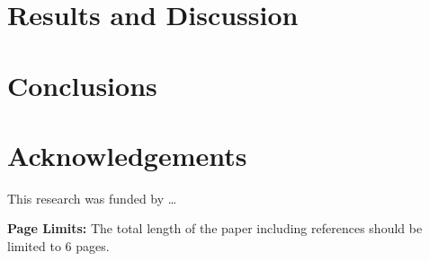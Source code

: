 \documentclass[12pt]{ussci}
\begin{document}
\section{Results and Discussion}
%
\blindtext

\section{Conclusions}
%
\blindtext

\blindtext

\section{Acknowledgements}
This research was funded by \ldots

\noindent\textbf{Page Limits:} The total length of the paper including references should be limited to 6 pages.

\printbibliography[heading=bibintoc]
\end{document}
